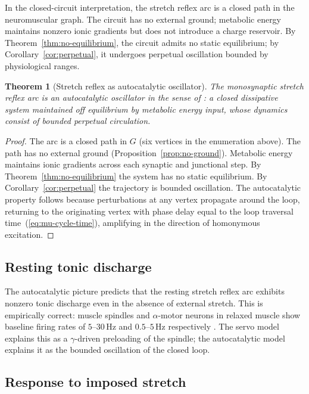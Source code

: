 \documentclass[11pt,twocolumn,a4paper]{article}
\newtheorem{theorem}{Theorem}[section]
\theoremstyle{definition}
\theoremstyle{remark}
\begin{document}
In the closed-circuit interpretation, the stretch reflex arc is a
closed path in the neuromuscular graph. The circuit has no external
ground; metabolic energy maintains nonzero ionic gradients but does
not introduce a charge reservoir. By Theorem~\ref{thm:no-equilibrium},
the circuit admits no static equilibrium; by
Corollary~\ref{cor:perpetual}, it undergoes perpetual oscillation
bounded by physiological ranges.

\begin{theorem}[Stretch reflex as autocatalytic oscillator]
\label{thm:stretch-reflex-oscillator}
The monosynaptic stretch reflex arc is an autocatalytic oscillator in
the sense of \citet{prigogine1977}: a closed dissipative system
maintained off equilibrium by metabolic energy input, whose dynamics
consist of bounded perpetual circulation.
\end{theorem}

\begin{proof}
The arc is a closed path in $G$ (six vertices in the enumeration
above). The path has no external ground (Proposition~\ref{prop:no-ground}).
Metabolic energy maintains ionic gradients across each synaptic and
junctional step. By Theorem~\ref{thm:no-equilibrium} the system has no
static equilibrium. By Corollary~\ref{cor:perpetual} the trajectory
is bounded oscillation. The autocatalytic property follows because
perturbations at any vertex propagate around the loop, returning to
the originating vertex with phase delay equal to the loop traversal
time~(\ref{eq:mu-cycle-time}), amplifying in the direction of
homonymous excitation.
\end{proof}

\subsection{Resting tonic discharge}

The autocatalytic picture predicts that the resting stretch reflex arc
exhibits nonzero tonic discharge even in the absence of external
stretch. This is empirically correct: muscle spindles and
$\alpha$-motor neurons in relaxed muscle show baseline firing rates of
$5$--$30$\,Hz and $0.5$--$5$\,Hz respectively \citep{burke1976,%
edin1990}. The servo model explains this as a $\gamma$-driven
preloading of the spindle; the autocatalytic model explains it as the
bounded oscillation of the closed loop.

\subsection{Response to imposed stretch}
\end{document}
